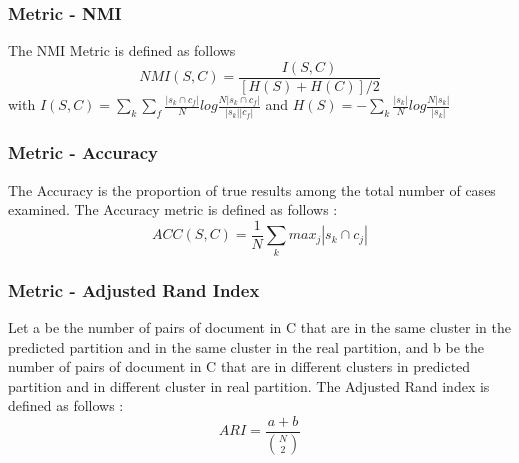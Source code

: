 \documentclass{beamer}
\begin{document}
\begin{frame}
\frametitle{Metric - NMI}
The NMI Metric is defined as follows
$$NMI(S,C) = \frac{I(S,C)}{[H(S)+H(C)]/2}$$ 
with
$I(S,C) =\sum_k \sum_f\frac{|s_k \cap c_f|}{N}log\frac{N|s_k \cap c_f|}{|s_k| |c_f|}$
and
$H(S) = -\sum_k\frac{|s_k|}{N}log\frac{N|s_k|}{|s_k|}$
\end{frame}

\begin{frame}
\frametitle{Metric - Accuracy}
The Accuracy is the proportion of true results among the total
  number of cases examined. The Accuracy metric is defined as follows :
$$
ACC(S,C) = \frac{1}{N}\sum_k {max}_j|s_k \cap c_j|
$$
\end{frame}

\begin{frame}
\frametitle{Metric - Adjusted Rand Index}
Let a be the number of pairs of document in C
  that are in the same cluster in the predicted partition and in the
  same cluster in the real partition, and b be the number of pairs of
  document in C that are in different clusters in predicted partition
  and in different cluster in real partition.
  The Adjusted Rand index is defined as follows :
  $$ARI = \frac{a+b}{\binom{N}{2}}$$
\end{frame}
\end{document}
